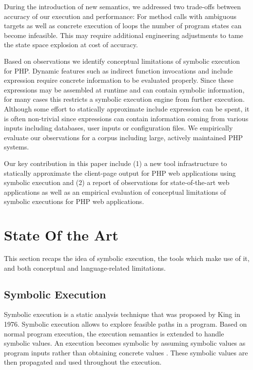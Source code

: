 \documentclass[sigconf]{acmart}
\begin{document}
During the introduction of new semantics, we addressed two  trade-offs between
accuracy of our execution and performance: For method calls with ambiguous
targets as well as concrete execution of loops the number of program states can
become infeasible. This may require additional engineering adjustments to tame
the state space explosion at cost of accuracy.

Based on observations we identify conceptual limitations of symbolic
execution for PHP.  Dynamic features such as indirect function invocations and
include expression require concrete information to be evaluated properly. Since
these expressions may be assembled at runtime and can contain symbolic
information, for many cases this restricts a symbolic execution engine from
further execution.
Although some effort to statically approximate include expression can be spent,
it is often non-trivial since expressions can contain information coming from
various inputs including databases, user inputs or configuration files. We
empirically evaluate our observations for a corpus including large, actively maintained PHP systems.

Our key contribution in this paper include (1)  a new tool infrastructure to
statically approximate the client-page output for PHP web applications using
symbolic execution and (2) a report of observations for state-of-the-art
web applications as well as an empirical evaluation of conceptual limitations
of symbolic executions for PHP web applications.

\section{State Of the Art}\label{sec:stateoftheart}
This section recaps the idea of symbolic
execution, the tools which make use of it, and both conceptual and
language-related limitations.

\subsection{Symbolic Execution}
Symbolic execution is a static analysis technique that was proposed by King
\cite{King1976} in 1976. Symbolic execution allows to explore feasible paths in a program. Based on normal program execution, the execution semantics
is extended to handle symbolic values. An execution becomes symbolic by
assuming symbolic values as program inputs rather than obtaining concrete
values \cite{King1976,Darringer1978}. These symbolic values are then propagated
and used throughout the execution. 
\end{document}

